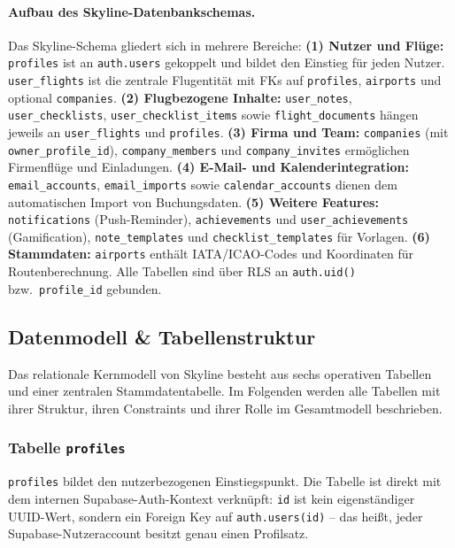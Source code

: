 \paragraph{Aufbau des Skyline-Datenbankschemas.}
Das Skyline-Schema gliedert sich in mehrere Bereiche:
\textbf{(1) Nutzer und Flüge:} \texttt{profiles} ist an \texttt{auth.users} gekoppelt und bildet den Einstieg für jeden Nutzer.
\texttt{user\_flights} ist die zentrale Flugentität mit FKs auf \texttt{profiles}, \texttt{airports} und optional \texttt{companies}.
\textbf{(2) Flugbezogene Inhalte:} \texttt{user\_notes}, \texttt{user\_checklists}, \texttt{user\_checklist\_items} sowie
\texttt{flight\_documents} hängen jeweils an \texttt{user\_flights} und \texttt{profiles}.
\textbf{(3) Firma und Team:} \texttt{companies} (mit \texttt{owner\_profile\_id}), \texttt{company\_members} und
\texttt{company\_invites} ermöglichen Firmenflüge und Einladungen.
\textbf{(4) E-Mail- und Kalenderintegration:} \texttt{email\_accounts}, \texttt{email\_imports} sowie
\texttt{calendar\_accounts} dienen dem automatischen Import von Buchungsdaten.
\textbf{(5) Weitere Features:} \texttt{notifications} (Push-Reminder), \texttt{achievements} und
\texttt{user\_achievements} (Gamification), \texttt{note\_templates} und \texttt{checklist\_templates} für Vorlagen.
\textbf{(6) Stammdaten:} \texttt{airports} enthält IATA/ICAO-Codes und Koordinaten für Routenberechnung.
Alle Tabellen sind über RLS an \texttt{auth.uid()} bzw.\ \texttt{profile\_id} gebunden.

\subsection{Datenmodell \& Tabellenstruktur}

Das relationale Kernmodell von Skyline besteht aus sechs operativen Tabellen und
einer zentralen Stammdatentabelle.
Im Folgenden werden alle Tabellen mit ihrer Struktur, ihren Constraints und
ihrer Rolle im Gesamtmodell beschrieben.

\subsubsection*{Tabelle \texttt{profiles}}

\texttt{profiles} bildet den nutzerbezogenen Einstiegspunkt.
Die Tabelle ist direkt mit dem internen Supabase-Auth-Kontext verknüpft:
\texttt{id} ist kein eigenständiger UUID-Wert, sondern ein Foreign Key auf
\texttt{auth.users(id)} -- das heißt, jeder Supabase-Nutzeraccount besitzt
genau einen Profilsatz.

